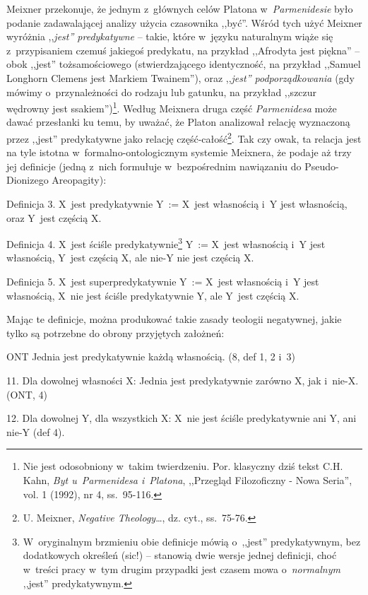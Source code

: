 Meixner przekonuje, że jednym z~głównych celów Platona w~\textit{Parmenidesie} było podanie zadawalającej analizy użycia czasownika ,,być''. Wśród tych użyć Meixner wyróżnia ,,\textit{jest'' predykatywne} -- takie, które w~języku naturalnym wiąże się z~przypisaniem czemuś jakiegoś predykatu, na przykład ,,Afrodyta jest piękna'' -- obok ,,jest'' tożsamościowego (stwierdzającego identyczność, na przykład ,,Samuel Longhorn Clemens jest Markiem Twainem''), oraz ,,\textit{jest'' podporządkowania} (gdy mówimy o~przynależności do rodzaju lub gatunku, na przykład ,,szczur wędrowny jest ssakiem'')\footnote{ Nie jest odosobniony w~takim twierdzeniu. Por. klasyczny dziś tekst C.H. Kahn, \textit{Byt u~Parmenidesa i~Platona}, ,,Przegląd Filozoficzny - Nowa Seria'', vol. 1 (1992), nr 4, ss.~95-116.}. Według Meixnera druga część \textit{Parmenidesa} może dawać przesłanki ku temu, by uważać, że Platon analizował relację wyznaczoną przez ,,jest'' predykatywne jako relację część-całość\footnote{ U. Meixner, \textit{Negative Theology}…, dz. cyt., ss.~75-76.}. Tak czy owak, ta relacja jest na tyle istotna w~formalno-ontologicznym systemie Meixnera, że podaje aż trzy jej definicje (jedną z~nich formułuje w~bezpośrednim nawiązaniu do Pseudo-Dionizego Areopagity):

Definicja 3. X~jest predykatywnie Y~:= X~jest własnością i~Y jest własnością, oraz Y~jest częścią X.

Definicja 4. X~jest ściśle predykatywnie\footnote{ W~oryginalnym brzmieniu obie definicje mówią o~,,jest'' predykatywnym, bez dodatkowych określeń (sic!) -- stanowią dwie wersje jednej definicji, choć w~treści pracy w~tym drugim przypadki jest czasem mowa o~\textit{normalnym} ,,jest'' predykatywnym.} Y~:= X~jest własnością i~Y jest własnością, Y~jest częścią X, ale nie-Y nie jest częścią X.

Definicja 5. X~jest superpredykatywnie Y~:= X~jest własnością i~Y jest własnością, X~nie jest ściśle predykatywnie Y, ale Y~jest częścią X.

Mając te definicje, można produkować takie zasady teologii negatywnej, jakie tylko są potrzebne do obrony przyjętych założneń:

ONT Jednia jest predykatywnie każdą własnością. (8, def 1, 2 i~3)

11. Dla dowolnej własności X: Jednia jest predykatywnie zarówno X, jak i~nie-X. (ONT, 4)

12. Dla dowolnej Y, dla wszystkich X: X~nie jest ściśle predykatywnie ani Y, ani nie-Y (def 4).

